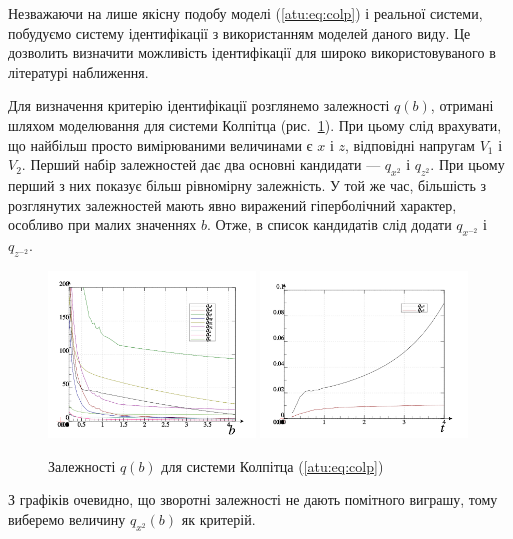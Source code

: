 Незважаючи на лише якісну подобу моделі (\ref{atu:eq:colp}) і реальної
системи, побудуємо систему ідентифікації з використанням
моделей даного виду. Це дозволить визначити можливість
ідентифікації для широко використовуваного в літературі
наближення.

Для визначення критерію ідентифікації розглянемо залежності
$q(b)$, отримані шляхом моделювання для системи Колпітца
(рис.~\ref{atu:f:colp_q}). При цьому слід врахувати, що найбільш просто
вимірюваними величинами є
$x$ і $z$, відповідні напругам
$V_1 $ і $ V_2 $. Перший набір залежностей дає два основні кандидати ---
$q_{x^2} $ і $ q_{z^2} $.
При цьому перший з них показує більш рівномірну
залежність. У той же час, більшість з розглянутих залежностей
мають явно виражений гіперболічний характер, особливо при
малих значеннях
$b $. Отже, в список кандидатів слід додати
$q_{x^{-2}} $ і $ q_{z^{-2}} $.

\begin{figure}[htb!]
\centerline{
  \includegraphics[width=0.49\textwidth]{p/mod/colp_p-p_b_e.png}
  \includegraphics[width=0.49\textwidth]{p/mod/colp_p-p_b_1ex2.png}
}
  \caption{Залежності $q(b) $ для системи Колпітца (\ref{atu:eq:colp})}
\label{atu:f:colp_q}
\end{figure}

З графіків очевидно, що зворотні залежності не дають помітного
виграшу, тому виберемо величину
$q_{x^2} (b) $ як критерій.


